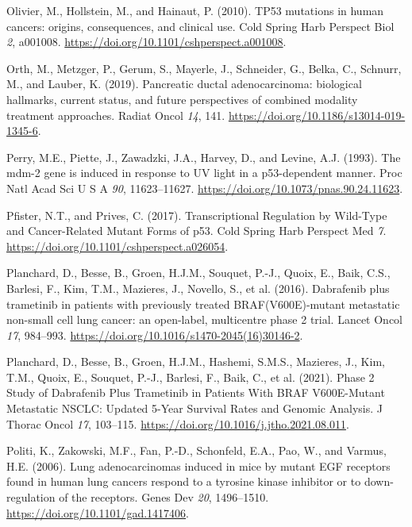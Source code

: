 \begin{CSLReferences}{0}{0}
\leavevmode{}%
Olivier, M., Hollstein, M., and Hainaut, P. (2010). TP53 mutations in human cancers: origins, consequences, and clinical use. Cold Spring Harb Perspect Biol \emph{2}, a001008. \url{https://doi.org/10.1101/cshperspect.a001008}.

\leavevmode{}%
Orth, M., Metzger, P., Gerum, S., Mayerle, J., Schneider, G., Belka, C., Schnurr, M., and Lauber, K. (2019). Pancreatic ductal adenocarcinoma: biological hallmarks, current status, and future perspectives of combined modality treatment approaches. Radiat Oncol \emph{14}, 141. \url{https://doi.org/10.1186/s13014-019-1345-6}.

\leavevmode{}%
Perry, M.E., Piette, J., Zawadzki, J.A., Harvey, D., and Levine, A.J. (1993). The mdm-2 gene is induced in response to UV light in a p53-dependent manner. Proc Natl Acad Sci U S A \emph{90}, 11623--11627. \url{https://doi.org/10.1073/pnas.90.24.11623}.

\leavevmode{}%
Pfister, N.T., and Prives, C. (2017). Transcriptional Regulation by Wild-Type and Cancer-Related Mutant Forms of p53. Cold Spring Harb Perspect Med \emph{7}. \url{https://doi.org/10.1101/cshperspect.a026054}.

\leavevmode{}%
Planchard, D., Besse, B., Groen, H.J.M., Souquet, P.-J., Quoix, E., Baik, C.S., Barlesi, F., Kim, T.M., Mazieres, J., Novello, S., et al. (2016). Dabrafenib plus trametinib in patients with previously treated BRAF(V600E)-mutant metastatic non-small cell lung cancer: an open-label, multicentre phase 2 trial. Lancet Oncol \emph{17}, 984--993. \url{https://doi.org/10.1016/s1470-2045(16)30146-2}.

\leavevmode{}%
Planchard, D., Besse, B., Groen, H.J.M., Hashemi, S.M.S., Mazieres, J., Kim, T.M., Quoix, E., Souquet, P.-J., Barlesi, F., Baik, C., et al. (2021). Phase 2 Study of Dabrafenib Plus Trametinib in Patients With BRAF V600E-Mutant Metastatic NSCLC: Updated 5-Year Survival Rates and Genomic Analysis. J Thorac Oncol \emph{17}, 103--115. \url{https://doi.org/10.1016/j.jtho.2021.08.011}.

\leavevmode{}%
Politi, K., Zakowski, M.F., Fan, P.-D., Schonfeld, E.A., Pao, W., and Varmus, H.E. (2006). Lung adenocarcinomas induced in mice by mutant EGF receptors found in human lung cancers respond to a tyrosine kinase inhibitor or to down-regulation of the receptors. Genes Dev \emph{20}, 1496--1510. \url{https://doi.org/10.1101/gad.1417406}.


\end{CSLReferences}
